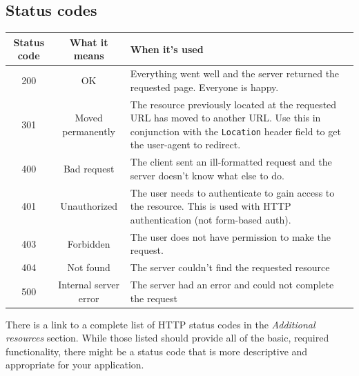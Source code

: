 \documentclass[12pt]{article}
\begin{document}
\subsection{Status codes}
\begin{center}
  \begin{tabular}{| c | c | p{7.06cm} |}
    \hline
    \textbf{Status code} & \textbf{What it means} & \textbf{When it's used} \\
    \hline
    200 & OK & Everything went well and the server returned the requested page. Everyone is happy. \\
    \hline
    301 & Moved permanently & The resource previously located at the requested URL has moved to another URL. Use this in conjunction with the \texttt{Location} header field to get the user-agent to redirect.\\
    \hline
    400 & Bad request & The client sent an ill-formatted request and the server doesn't know what else to do. \\
    \hline
    401 & Unauthorized & The user needs to authenticate to gain access to the resource. This is used with HTTP authentication (not form-based auth). \\
    \hline
    403 & Forbidden & The user does not have permission to make the request. \\
    \hline
    404 & Not found & The server couldn't find the requested resource \\
    \hline
    500 & Internal server error & The server had an error and could not complete the request \\
    \hline
  \end{tabular}
\end{center}
There is a link to a complete list of HTTP status codes in the \emph{Additional resources} section. While those listed should provide all of the basic, required functionality, there might be a status code that is more descriptive and appropriate for your application.
\end{document}

